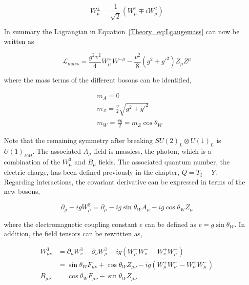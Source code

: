 \begin{equation}
    W_\mu^\pm = \frac{1}{\sqrt{2}}(W_\mu^1\mp i W_\mu^2)
\end{equation}

In summary the Lagrangian in Equation~\ref{Theory_eq:Lgaugemass} can now be written as

\begin{equation}
    \mathcal{L}_{mass} = \frac{g^2v^2}{4}W_\mu^+W^{- \mu} - \frac{v^2}{8}(g^2+g'^2)Z_\mu Z^\mu
\end{equation}

where the mass terms of the different bosons can be identified,

\begin{equation}
\begin{split}
    &m_A = 0\\
    &m_Z = \frac{v}{2}\sqrt{g^2+g'^2}\\
    &m_W = \frac{vg}{2} = m_Z \cos\theta_W
\end{split}
\end{equation}

Note that the remaining symmetry after breaking $SU(2)_L\otimes U(1)_L$ is $U(1)_{EM}$. The associated $A_\mu$ field is massless, the photon, which is a combination of the $W_\mu^3$ and $B_\mu$ fields. The associated quantum number, the electric charge, has been defined previously in the chapter, $Q = T_3-Y$.\\

Regarding interactions, the covariant derivative can be expressed in terms of the new bosons,

\begin{equation}
    \partial_\mu - igW_\mu^3 = \partial_\mu - ig\sin\theta_W A_\mu - ig\cos\theta_W Z_\mu
\end{equation}

where the electromagnetic coupling constant $e$ can be defined as $e=g\sin\theta_W$. In addition, the field tensors can be rewritten as,

\begin{equation}
\begin{split}
    W_{\mu\nu}^3 &= \partial_\mu W_\nu^3 - \partial_\nu W_\mu^3 - ig(W_\mu^+W_\nu^- - W_\nu^+ W_\mu^-)\\
    &= \sin\theta_W F_{\mu\nu} + \cos\theta_W Z_{\mu\nu} - ig(W_\mu^+W_\nu^- - W_\nu^+ W_\mu^-)\\
    B_{\mu\nu} &= \cos\theta_W F_{\mu\nu} - \sin\theta_W Z_{\mu\nu}
\end{split}
\end{equation}

